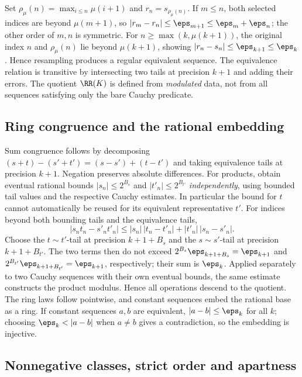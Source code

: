Set $\rho_\mu(n)=\max_{i\le n}\mu(i+1)$ and $r_n=s_{\rho_\mu(n)}$. If $m\le n$, both selected indices are beyond $\mu(m+1)$, so $|r_m-r_n|\le\eps_{m+1}\le\eps_m+\eps_n$; the other order of $m,n$ is symmetric. For $n\ge\max(k,\mu(k+1))$, the original index $n$ and $\rho_\mu(n)$ lie beyond $\mu(k+1)$, showing $|r_n-s_n|\le\eps_{k+1}\le\eps_k$. Hence resampling produces a regular equivalent sequence. The equivalence relation is transitive by intersecting two tails at precision $k+1$ and adding their errors. The quotient $\RR(K)$ is defined from \emph{modulated} data, not from all sequences satisfying only the bare Cauchy predicate.

\subsection{Ring congruence and the rational embedding}\label{supp:12-4}
\par{}\par\smallskip

Sum congruence follows by decomposing $(s+t)-(s'+t')=(s-s')+(t-t')$ and taking equivalence tails at precision $k+1$. Negation preserves absolute differences. For products, obtain eventual rational bounds $|s_n|\le 2^{B_s}$ and $|t'_n|\le2^{B_{t'}}$ \emph{independently}, using bounded tail values and the respective Cauchy estimates. In particular the bound for $t$ cannot automatically be reused for its equivalent representative $t'$. For indices beyond both bounding tails and the equivalence tails,
\[
|s_nt_n-s'_nt'_n|\le |s_n|\,|t_n-t'_n|+|t'_n|\,|s_n-s'_n|.
\]
Choose the $t\sim t'$-tail at precision $k+1+B_s$ and the $s\sim s'$-tail at precision $k+1+B_{t'}$. The two terms then do not exceed $2^{B_s}\eps_{k+1+B_s}=\eps_{k+1}$ and $2^{B_{t'}}\eps_{k+1+B_{t'}}=\eps_{k+1}$, respectively; their sum is $\eps_k$. Applied separately to two Cauchy sequences with their own eventual bounds, the same estimate constructs the product modulus. Hence all operations descend to the quotient. The ring laws follow pointwise, and constant sequences embed the rational base as a ring. If constant sequences $a,b$ are equivalent, $|a-b|\le\eps_k$ for all $k$; choosing $\eps_k<|a-b|$ when $a\ne b$ gives a contradiction, so the embedding is injective.

\subsection{Nonnegative classes, strict order and apartness}\label{supp:12-5}
\par{}\par\smallskip

